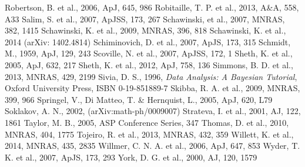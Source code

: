\documentclass[useAMS,usenatbib]{mn2e}
\begin{document}
\begin{thebibliography}{}
 Robertson, B. et al., 2006, ApJ, 645, 986
 Robitaille, T. P. et al., 2013, A\&A, 558, A33
 Salim, S. et al., 2007, ApJSS, 173, 267
 Schawinski, et al., 2007, MNRAS, 382, 1415
 Schawinski, K. et al., 2009, MNRAS, 396, 818
 Schawinski, K. et al., 2014 (arXiv: 1402.4814)
 Schiminovich, D. et al., 2007, ApJS, 173, 315
 Schmidt, M., 1959, ApJ, 129, 243
 Scoville, N. et al., 2007, ApJSS, 172, 1
 Sheth, K. et al., 2005, ApJ, 632, 217
 Sheth, K. et al., 2012, ApJ, 758, 136
 Simmons, B. D. et al., 2013, MNRAS, 429, 2199
 Sivia, D. S., 1996, \emph{Data Analysis: A Bayesian Tutorial}, Oxford University Press, ISBN 0-19-851889-7
 Skibba, R. A. et al., 2009, MNRAS, 399, 966
 Springel, V., Di Matteo, T. \& Hernquist, L., 2005, ApJ, 620, L79
 Soklakov, A. N., 2002, (arXiv:math-ph/0009007)
 Strateva, I. et al., 2001, AJ, 122, 1861
 Taylor, M. B., 2005, ASP Conference Series, 347
 Thomas, D. et al., 2010, MNRAS, 404, 1775
 Tojeiro, R. et al., 2013, MNRAS, 432, 359
 Willett, K. et al., 2014, MNRAS, 435, 2835
 Willmer, C. N. A. et al., 2006, ApJ, 647, 853
 Wyder, T. K. et al., 2007, ApJS, 173, 293
 York, D. G. et al., 2000, AJ, 120, 1579
\end{thebibliography}{}
\end{document}
